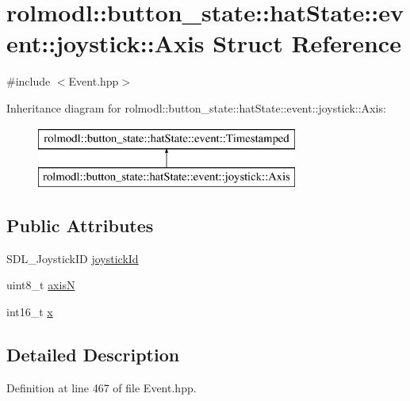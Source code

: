 \hypertarget{structrolmodl_1_1button__state_1_1hat_state_1_1event_1_1joystick_1_1_axis}{}\section{rolmodl\+::button\+\_\+state\+::hat\+State\+::event\+::joystick\+::Axis Struct Reference}
\label{structrolmodl_1_1button__state_1_1hat_state_1_1event_1_1joystick_1_1_axis}


{\ttfamily \#include $<$Event.\+hpp$>$}

Inheritance diagram for rolmodl\+::button\+\_\+state\+::hat\+State\+::event\+::joystick\+::Axis\+:\begin{figure}[H]
\begin{center}
\leavevmode
\includegraphics[height=2.000000cm]{structrolmodl_1_1button__state_1_1hat_state_1_1event_1_1joystick_1_1_axis}
\end{center}
\end{figure}
\subsection*{Public Attributes}
\begin{DoxyCompactItemize}
\item 
S\+D\+L\+\_\+\+Joystick\+ID \mbox{\hyperlink{structrolmodl_1_1button__state_1_1hat_state_1_1event_1_1joystick_1_1_axis_ad6603ba1c0ea31fb8d410f86857db92a}{joystick\+Id}}
\item 
uint8\+\_\+t \mbox{\hyperlink{structrolmodl_1_1button__state_1_1hat_state_1_1event_1_1joystick_1_1_axis_ab3427acc4c882b5ec59319877cc34572}{axisN}}
\item 
int16\+\_\+t \mbox{\hyperlink{structrolmodl_1_1button__state_1_1hat_state_1_1event_1_1joystick_1_1_axis_ad8ad41c4b02ad2d05d6a29c00e2ec06f}{x}}
\end{DoxyCompactItemize}


\subsection{Detailed Description}


Definition at line 467 of file Event.\+hpp.



